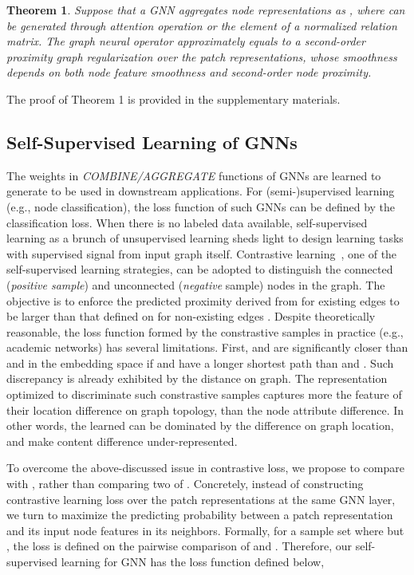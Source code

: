 \documentclass[preprint]{article}
\newtheorem{theorem}{Theorem}
\begin{document}
\begin{theorem}\label{gcn:high:prox}
Suppose that a GNN aggregates node representations as , where  can be generated through attention operation or the element of a normalized relation matrix. The graph neural operator approximately equals to a second-order proximity graph regularization over the patch representations, whose smoothness depends on both node feature smoothness and second-order node proximity.
\end{theorem}
The proof of Theorem 1 is provided in the supplementary materials. 

\subsection{Self-Supervised Learning of GNNs}\label{ssl:gnn}
The weights in \emph{COMBINE/AGGREGATE} functions of  GNNs are learned to generate  to be used in downstream applications. For (semi-)supervised learning (e.g., node classification), the loss function of such GNNs can be defined by the classification loss. When there is no labeled data available, self-supervised learning as a brunch of unsupervised learning sheds light to design learning tasks with supervised signal from input graph itself. 
Contrastive learning~\cite{perozzi2014deepwalk,mnih2013learning}, one of the  self-supervised learning strategies,  can be adopted  to distinguish the connected (\emph{positive sample}) and unconnected (\emph{negative} sample) nodes in the graph. The objective is to enforce the predicted proximity derived from  for existing edges  to be larger than that defined on    for non-existing edges .    Despite theoretically reasonable, the loss function formed by the constrastive samples in practice (e.g., academic networks) has several limitations. First,  and  are significantly closer  than  and  in the embedding space if  and  have a longer shortest path  than  and . Such discrepancy is already exhibited by the distance on graph. The representation  optimized to  discriminate such constrastive samples captures more the feature of their location difference on graph topology, than the node attribute difference. In other words, the learned  can be dominated by the difference on graph location, and make content difference under-represented. 

To overcome the above-discussed issue in contrastive loss, we propose to compare  with , rather than comparing two of . Concretely,  
instead of constructing contrastive learning loss over the patch representations  at the same GNN layer, we turn to maximize the predicting probability between a patch representation  and its input node features  in its neighbors. Formally, for a sample set  where   but , the loss  is defined on the pairwise comparison of   and . Therefore, our self-supervised learning for GNN has the loss function defined below,
\end{document}
